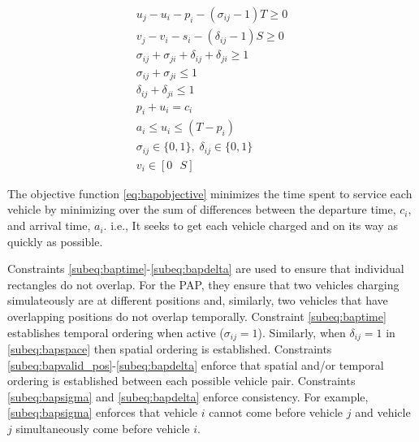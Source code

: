 \documentclass[letterpaper, 10pt, conference]{IEEEtran}
\begin{document}
\begin{subequations}
\label{eq:bapconstrs}
\begin{align}
    u_j - u_i - p_i - (\sigma_{ij} - 1)T \geq 0                   \label{subeq:baptime}         \\
    v_j - v_i - s_i - (\delta_{ij} - 1)S \geq 0                   \label{subeq:bapspace}        \\
    \sigma_{ij} + \sigma_{ji} + \delta_{ij} + \delta_{ji} \geq 1  \label{subeq:bapvalid_pos}    \\
    \sigma_{ij} + \sigma_{ji} \leq 1                              \label{subeq:bapsigma}        \\
    \delta_{ij} + \delta_{ji} \leq 1                              \label{subeq:bapdelta}        \\
    p_i + u_i = c_i                                               \label{subeq:bapdetach}       \\
    a_i \leq u_i \leq (T - p_i)                                   \label{subeq:bapvalid_starts} \\
    \sigma_{ij} \in \{0,1\},\;\delta_{ij} \in \{0,1\}\;           \label{subeq:bapsdspace}      \\
    v_i \in [0 \mbox{ } S ]                                       \label{subeq:bapvspace}
\end{align}
\end{subequations}

\noindent

% 


The objective function \eqref{eq:bapobjective} minimizes the time spent to service each vehicle by minimizing over the
sum of differences between the departure time, $c_i$, and arrival time, $a_i$. i.e., It seeks to get each vehicle charged and on its way as quickly as possible.

Constraints \ref{subeq:baptime}-\ref{subeq:bapdelta} are used to ensure that individual rectangles do not overlap. For the PAP, they ensure that two vehicles charging simulateously are at different positions and, similarly, two vehicles that have overlapping positions do not overlap temporally. Constraint \eqref{subeq:baptime} establishes temporal ordering when active ($\sigma_{ij}=1$). Similarly, when $\delta_{ij} =1$ in \eqref{subeq:bapspace} then spatial ordering is established. Constraints \ref{subeq:bapvalid_pos}-\ref{subeq:bapdelta} enforce that spatial and/or temporal ordering is established between each possible vehicle pair. Constraints \eqref{subeq:bapsigma} and \eqref{subeq:bapdelta} enforce consistency. For example, \eqref{subeq:bapsigma} enforces that vehicle $i$ cannot come before vehicle $j$ and vehicle $j$ simultaneously come before vehicle $i$.
\end{document}
